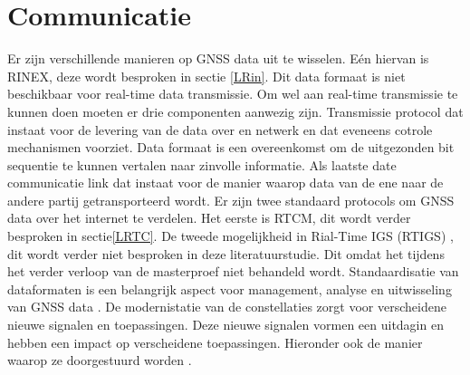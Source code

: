\section{Communicatie}
\label{LCom}
Er zijn verschillende manieren op GNSS data uit te wisselen. E\'en hiervan is RINEX, deze wordt besproken in sectie \ref{LRin}. Dit data formaat is niet beschikbaar voor real-time data transmissie. Om wel aan real-time transmissie te kunnen doen moeten er drie componenten aanwezig zijn. Transmissie protocol dat instaat voor de levering van de data over en netwerk en dat eveneens cotrole mechanismen voorziet. Data formaat is een overeenkomst om de uitgezonden bit sequentie te kunnen vertalen naar zinvolle informatie. Als laatste date communicatie link dat instaat voor de manier waarop data van de ene naar de andere partij getransporteerd wordt. Er zijn twee standaard protocols om GNSS data over het internet te verdelen. Het eerste is RTCM, dit wordt verder besproken in sectie\ref{LRTC}. De tweede mogelijkheid in Rial-Time IGS (RTIGS) \cite{LBibRTCM}, dit wordt verder niet besproken in deze literatuurstudie. Dit omdat het tijdens het verder verloop van de masterproef niet behandeld wordt. Standaardisatie van dataformaten is een belangrijk aspect voor management, analyse en uitwisseling van GNSS data \cite{LBibRINEX}. De modernistatie van de constellaties zorgt voor verscheidene nieuwe signalen en toepassingen. Deze nieuwe signalen vormen een uitdagin en hebben een impact op verscheidene toepassingen. Hieronder ook de manier waarop ze doorgestuurd worden \cite{LBibRINEX2}. 

